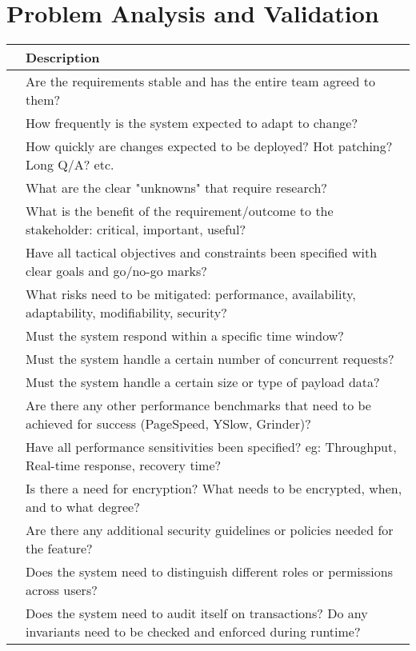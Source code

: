 \documentclass{article}
\begin{document}
\section{Problem Analysis and Validation}
\begin{center}
    \begin{tabular}{ | p{.25cm} || p{10cm} |}
    \hline
     & Description \\ \hline
     & Are the requirements stable and has the entire team agreed to them? \\ \hline
     & How frequently is the system expected to adapt to change? \\ \hline
     & How quickly are changes expected to be deployed? Hot patching? Long Q/A? etc.  \\ \hline
     & What are the clear "unknowns" that require research? \\ \hline
     & What is the benefit of the requirement/outcome to the stakeholder: critical, important, useful? \\ \hline
     & Have all tactical objectives and constraints been specified with clear goals and go/no-go marks? \\ \hline
     & What risks need to be mitigated: performance, availability, adaptability, modifiability, security? \\ \hline
     & Must the system respond within a specific time window? \\ \hline
     & Must the system handle a certain number of concurrent requests? \\ \hline
     & Must the system handle a certain size or type of payload data? \\ \hline
     & Are there any other performance benchmarks that need to be achieved for success (PageSpeed, YSlow, Grinder)? \\ \hline
     & Have all performance sensitivities been specified? eg: Throughput, Real-time response, recovery time? \\ \hline
     & Is there a need for encryption? What needs to be encrypted, when, and to what degree? \\ \hline
     & Are there any additional security guidelines or policies needed for the feature? \\ \hline
     & Does the system need to distinguish different roles or permissions across users? \\ \hline
     & Does the system need to audit itself on transactions? Do any invariants need to be checked and enforced during runtime? \\ \hline

\end{tabular}
\end{center}
\end{document}
